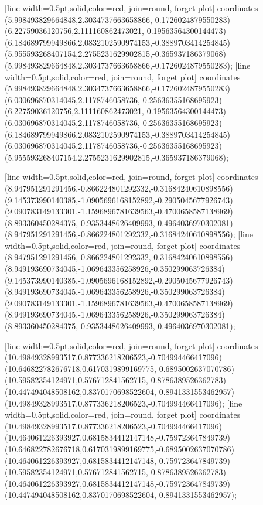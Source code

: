 [line width=0.5pt,solid,color=red, join=round, forget plot] coordinates {(5.998493829664848,2.3034737663658866,-0.1726024879550283) (6.22759036120756,2.111160862473021,-0.19563564300144473) (6.184689799949866,2.0832102590974153,-0.3889703414254845) (5.955593268407154,2.2755231629902815,-0.365937186379068) (5.998493829664848,2.3034737663658866,-0.1726024879550283)};
[line width=0.5pt,solid,color=red, join=round, forget plot] coordinates {(5.998493829664848,2.3034737663658866,-0.1726024879550283) (6.030696870314045,2.1178746058736,-0.25636355168695923) (6.22759036120756,2.111160862473021,-0.19563564300144473) (6.030696870314045,2.1178746058736,-0.25636355168695923) (6.184689799949866,2.0832102590974153,-0.3889703414254845) (6.030696870314045,2.1178746058736,-0.25636355168695923) (5.955593268407154,2.2755231629902815,-0.365937186379068)};

[line width=0.5pt,solid,color=red, join=round, forget plot] coordinates {(8.947951291291456,-0.866224801292332,-0.31684240610898556) (9.145373990140385,-1.0905696168152892,-0.2905045677926743) (9.090783149133301,-1.1596896781639563,-0.4700658587138969) (8.893360450284375,-0.9353448626409993,-0.4964036970302081) (8.947951291291456,-0.866224801292332,-0.31684240610898556)};
[line width=0.5pt,solid,color=red, join=round, forget plot] coordinates {(8.947951291291456,-0.866224801292332,-0.31684240610898556) (8.949193690734045,-1.069643356258926,-0.350299063726384) (9.145373990140385,-1.0905696168152892,-0.2905045677926743) (8.949193690734045,-1.069643356258926,-0.350299063726384) (9.090783149133301,-1.1596896781639563,-0.4700658587138969) (8.949193690734045,-1.069643356258926,-0.350299063726384) (8.893360450284375,-0.9353448626409993,-0.4964036970302081)};

[line width=0.5pt,solid,color=red, join=round, forget plot] coordinates {(10.49849328993517,0.877336218206523,-0.704994466417096) (10.646822782676718,0.6170319899169775,-0.6895002637070786) (10.59582354124971,0.576712841562715,-0.8786389526362783) (10.447494048508162,0.8370170698522604,-0.8941331553462957) (10.49849328993517,0.877336218206523,-0.704994466417096)};
[line width=0.5pt,solid,color=red, join=round, forget plot] coordinates {(10.49849328993517,0.877336218206523,-0.704994466417096) (10.464061226393927,0.6815834412147148,-0.759723647849739) (10.646822782676718,0.6170319899169775,-0.6895002637070786) (10.464061226393927,0.6815834412147148,-0.759723647849739) (10.59582354124971,0.576712841562715,-0.8786389526362783) (10.464061226393927,0.6815834412147148,-0.759723647849739) (10.447494048508162,0.8370170698522604,-0.8941331553462957)};

